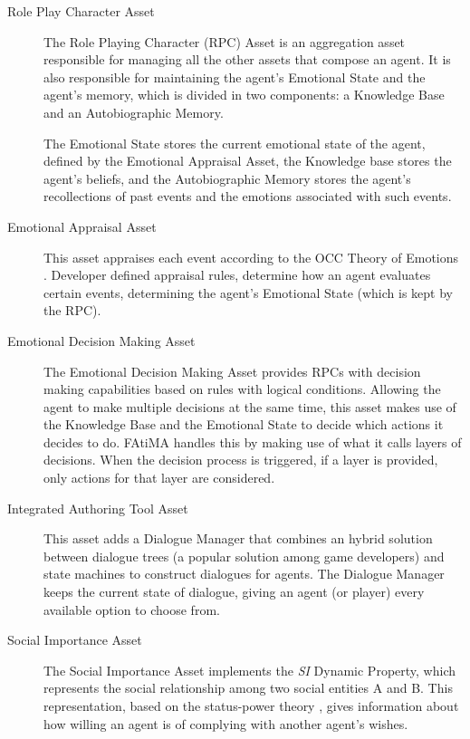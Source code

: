 \begin{description}
\item [Role Play Character Asset] \hfill

The Role Playing Character (RPC) Asset is an aggregation asset responsible for managing all the other assets that compose an agent.
It is also responsible for maintaining the agent's Emotional State and the agent's memory, which is divided in two components: a Knowledge Base and an Autobiographic Memory.

The Emotional State stores the current emotional state of the agent, defined by the Emotional Appraisal Asset, the Knowledge base stores the agent's beliefs, and the Autobiographic Memory stores the agent's recollections of past events and the emotions associated with such events.

\item [Emotional Appraisal Asset] \hfill

This asset appraises each event according to the OCC Theory of Emotions \cite{ortony:occ}.
Developer defined appraisal rules, determine how an agent evaluates certain events, determining the agent's Emotional State (which is kept by the RPC).

\item [Emotional Decision Making Asset] \hfill

The Emotional Decision Making Asset provides RPCs with decision making capabilities based on rules with logical conditions.
Allowing the agent to make multiple decisions at the same time, this asset makes use of the Knowledge Base and the Emotional State to decide which actions it decides to do.
FAtiMA handles this by making use of what it calls layers of decisions.
When the decision process is triggered, if a layer is provided, only actions for that layer are considered.

\item [Integrated Authoring Tool Asset] \hfill

This asset adds a Dialogue Manager that combines an hybrid solution between dialogue trees (a popular solution among game developers) and state machines to construct dialogues for agents.
The Dialogue Manager keeps the current state of dialogue, giving an agent (or player) every available option to choose from.

\item [Social Importance Asset] \hfill

The Social Importance Asset implements the \textit{SI} Dynamic Property, which represents the social relationship among two social entities A and B.
This representation, based on the status-power theory \cite{kemper:status-power}, gives information about how willing an agent is of complying with another agent's wishes.


\end{description}
